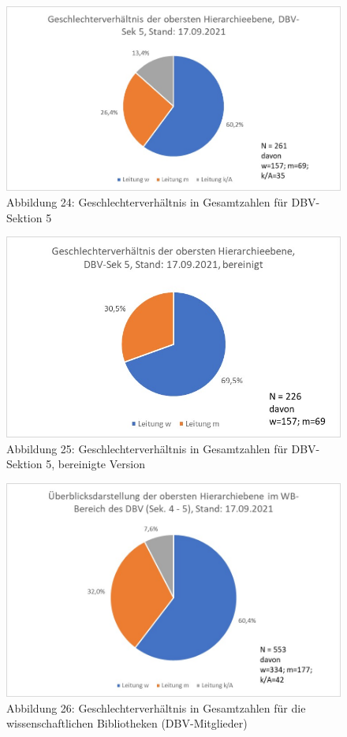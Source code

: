 \documentclass[a4paper,
fontsize=11pt,
oneside,
numbers=noperiodatend,
parskip=half-,
bibliography=totoc,
final
]{scrartcl}
\begin{document}
\begin{figure}
\centering
\includegraphics{img/Abb_24_DBV-Sek5_gesamt.jpg}
\caption{Abbildung 24: Geschlechterverhältnis in Gesamtzahlen für
DBV-Sektion 5}
\end{figure}

\begin{figure}
\centering
\includegraphics{img/Abb_25_DBV-Sek5_gesamt_bereinigt.jpg}
\caption{Abbildung 25: Geschlechterverhältnis in Gesamtzahlen für
DBV-Sektion 5, bereinigte Version}
\end{figure}

\begin{figure}
\centering
\includegraphics{img/Abb_26_DBV-Sek4-5_gesamt.jpg}
\caption{Abbildung 26: Geschlechterverhältnis in Gesamtzahlen für die
wissenschaftlichen Bibliotheken (DBV-Mitglieder)}
\end{figure}
\end{document}
